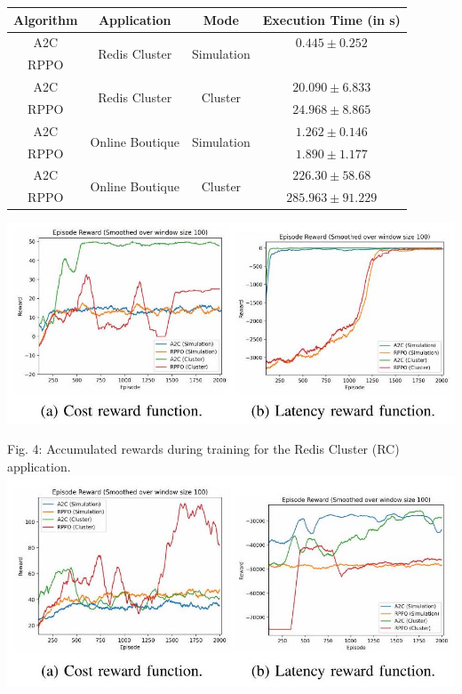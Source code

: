 \documentclass[10pt]{article}
\begin{document}
\begin{center}
\begin{tabular}{|c|c|c|c|}
\hline
Algorithm & Application & Mode & Execution Time (in s) \\
\hline
A2C & \multirow{2}{*}{Redis Cluster} & \multirow{2}{*}{Simulation} & $0.445 \pm 0.252$ \\
RPPO &  &  &  \\
\hline
A2C & \multirow{2}{*}{Redis Cluster} & \multirow{2}{*}{Cluster} & $20.090 \pm 6.833$ \\
RPPO &  &  & $24.968 \pm 8.865$ \\
\hline
A2C & \multirow{2}{*}{Online Boutique} & \multirow{2}{*}{Simulation} & $1.262 \pm 0.146$ \\
RPPO &  &  & $1.890 \pm 1.177$ \\
\hline
A2C & \multirow{2}{*}{Online Boutique} & \multirow{2}{*}{Cluster} & $226.30 \pm 58.68$ \\
RPPO &  &  & $285.963 \pm 91.229$ \\
\hline
\end{tabular}
\end{center}

\begin{center}
\includegraphics[max width=\textwidth]{2024_11_17_21ad14b6196e5740bf69g-7}
\end{center}

Fig. 4: Accumulated rewards during training for the Redis Cluster (RC) application.\\
\includegraphics[max width=\textwidth, center]{2024_11_17_21ad14b6196e5740bf69g-7(1)}
\end{document}
